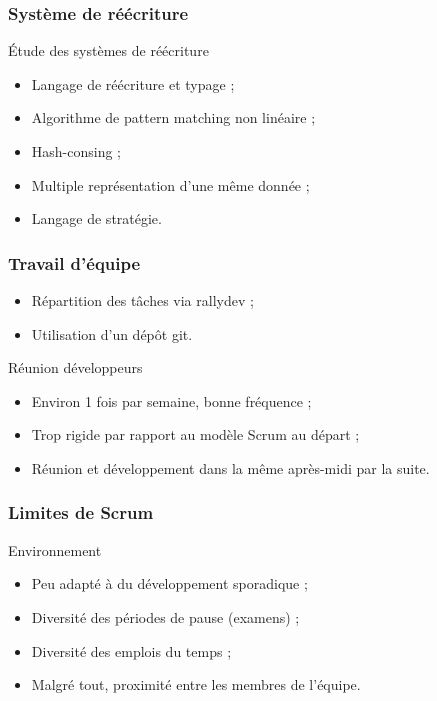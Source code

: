 \begin{frame}
\frametitle{Système de réécriture}

\begin{block}{Étude des systèmes de réécriture}
\begin{itemize}
\item Langage de réécriture et typage ;
\item Algorithme de pattern matching non linéaire ;
\item Hash-consing ;
\item Multiple représentation d'une même donnée ;
\item Langage de stratégie.
\end{itemize}
\end{block}

\end{frame}

\begin{frame}
\frametitle{Travail d'équipe}

\begin{itemize}
\item Répartition des tâches via rallydev ;
\item Utilisation d'un dépôt git.
\end{itemize}
\pause
\begin{block}{Réunion développeurs}
\begin{itemize}
\item Environ 1 fois par semaine, bonne fréquence ;
\item Trop rigide par rapport au modèle Scrum au départ ;
\item Réunion et développement dans la même après-midi par la suite.
\end{itemize}
\end{block}
\end{frame}

\begin{frame}
\frametitle{Limites de Scrum}

\begin{block}{Environnement}
\begin{itemize}
\item Peu adapté à du développement sporadique ;
\item Diversité des périodes de pause (examens) ;
\item Diversité des emplois du temps ;
\item Malgré tout, proximité entre les membres de l'équipe.
\end{itemize}
\end{block}
\pause

\end{frame}

